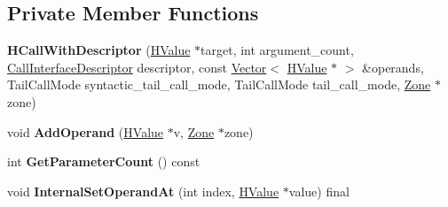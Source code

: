 \subsection*{Private Member Functions}
\begin{DoxyCompactItemize}
\item 
{\bfseries H\+Call\+With\+Descriptor} (\hyperlink{classv8_1_1internal_1_1_h_value}{H\+Value} $\ast$target, int argument\+\_\+count, \hyperlink{classv8_1_1internal_1_1_call_interface_descriptor}{Call\+Interface\+Descriptor} descriptor, const \hyperlink{classv8_1_1internal_1_1_vector}{Vector}$<$ \hyperlink{classv8_1_1internal_1_1_h_value}{H\+Value} $\ast$ $>$ \&operands, Tail\+Call\+Mode syntactic\+\_\+tail\+\_\+call\+\_\+mode, Tail\+Call\+Mode tail\+\_\+call\+\_\+mode, \hyperlink{classv8_1_1internal_1_1_zone}{Zone} $\ast$zone)\hypertarget{classv8_1_1internal_1_1_h_call_with_descriptor_abe818633849715cc2923224d443e1e3a}{}\label{classv8_1_1internal_1_1_h_call_with_descriptor_abe818633849715cc2923224d443e1e3a}

\item 
void {\bfseries Add\+Operand} (\hyperlink{classv8_1_1internal_1_1_h_value}{H\+Value} $\ast$v, \hyperlink{classv8_1_1internal_1_1_zone}{Zone} $\ast$zone)\hypertarget{classv8_1_1internal_1_1_h_call_with_descriptor_a2f154361229bad3c62c37242c2146102}{}\label{classv8_1_1internal_1_1_h_call_with_descriptor_a2f154361229bad3c62c37242c2146102}

\item 
int {\bfseries Get\+Parameter\+Count} () const \hypertarget{classv8_1_1internal_1_1_h_call_with_descriptor_a8dc5dce6f8e0e794eeb1721098c0feef}{}\label{classv8_1_1internal_1_1_h_call_with_descriptor_a8dc5dce6f8e0e794eeb1721098c0feef}

\item 
void {\bfseries Internal\+Set\+Operand\+At} (int index, \hyperlink{classv8_1_1internal_1_1_h_value}{H\+Value} $\ast$value) final\hypertarget{classv8_1_1internal_1_1_h_call_with_descriptor_adb050d5575fc88e976a913e2f8ba3c02}{}\label{classv8_1_1internal_1_1_h_call_with_descriptor_adb050d5575fc88e976a913e2f8ba3c02}

\end{DoxyCompactItemize}
